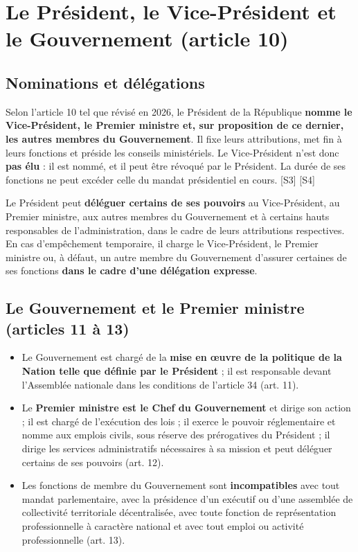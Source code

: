 \documentclass[11pt,a4paper,oneside]{report}
\newcommand{\src}[1]{\textcolor{bluec}{\scriptsize[#1]}}
\begin{document}
\section{Le Président, le Vice-Président et le Gouvernement (article 10)}
\subsection{Nominations et délégations}
Selon l'article 10 tel que révisé en 2026, le Président de la République \textbf{nomme le Vice-Président, le Premier ministre et, sur proposition de ce dernier, les autres membres du Gouvernement}. Il fixe leurs attributions, met fin à leurs fonctions et préside les conseils ministériels. Le Vice-Président n'est donc \textbf{pas élu} : il est nommé, et il peut être révoqué par le Président. La durée de ses fonctions ne peut excéder celle du mandat présidentiel en cours. \src{S3} \src{S4}

Le Président peut \textbf{déléguer certains de ses pouvoirs} au Vice-Président, au Premier ministre, aux autres membres du Gouvernement et à certains hauts responsables de l'administration, dans le cadre de leurs attributions respectives. En cas d'empêchement temporaire, il charge le Vice-Président, le Premier ministre ou, à défaut, un autre membre du Gouvernement d'assurer certaines de ses fonctions \textbf{dans le cadre d'une délégation expresse}.

\subsection{Le Gouvernement et le Premier ministre (articles 11 à 13)}
\begin{itemize}
  \item Le Gouvernement est chargé de la \textbf{mise en œuvre de la politique de la Nation telle que définie par le Président} ; il est responsable devant l'Assemblée nationale dans les conditions de l'article 34 (art. 11).
  \item Le \textbf{Premier ministre est le Chef du Gouvernement} et dirige son action ; il est chargé de l'exécution des lois ; il exerce le pouvoir réglementaire et nomme aux emplois civils, sous réserve des prérogatives du Président ; il dirige les services administratifs nécessaires à sa mission et peut déléguer certains de ses pouvoirs (art. 12).
  \item Les fonctions de membre du Gouvernement sont \textbf{incompatibles} avec tout mandat parlementaire, avec la présidence d'un exécutif ou d'une assemblée de collectivité territoriale décentralisée, avec toute fonction de représentation professionnelle à caractère national et avec tout emploi ou activité professionnelle (art. 13).
\end{itemize}
\end{document}
